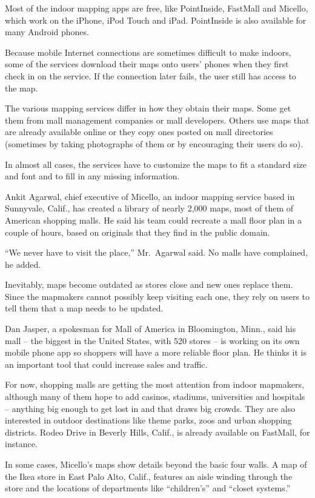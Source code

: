 ﻿\documentclass[12pt]{article}
\begin{document}
Most of the indoor mapping apps are free, like PointInside, FastMall and Micello, which work on the
iPhone, iPod Touch and iPad. PointInside is also available for many Android phones.

Because mobile Internet connections are sometimes difficult to make indoors, some of the services
download their maps onto users' phones when they first check in on the service. If the connection
later fails, the user still has access to the map.

The various mapping services differ in how they obtain their maps. Some get them from mall
management companies or mall developers. Others use maps that are already available online or they
copy ones posted on mall directories (sometimes by taking photographs of them or by encouraging
their users do so).

In almost all cases, the services have to customize the maps to fit a standard size and font and to
fill in any missing information.

Ankit Agarwal, chief executive of Micello, an indoor mapping service based in Sunnyvale, Calif., has
created a library of nearly 2,000 maps, most of them of American shopping malls. He said his team
could recreate a mall floor plan in a couple of hours, based on originals that they find in the
public domain.

``We never have to visit the place,'' Mr.~Agarwal said. No malls have complained, he added.

Inevitably, maps become outdated as stores close and new ones replace them. Since the mapmakers
cannot possibly keep visiting each one, they rely on users to tell them that a map needs to be
updated.

Dan Jasper, a spokesman for Mall of America in Bloomington, Minn., said his mall -- the biggest in
the United States, with 520 stores -- is working on its own mobile phone app so shoppers will have a
more reliable floor plan. He thinks it is an important tool that could increase sales and traffic.

For now, shopping malls are getting the most attention from indoor mapmakers, although many of them
hope to add casinos, stadiums, universities and hospitals -- anything big enough to get lost in and
that draws big crowds. They are also interested in outdoor destinations like theme parks, zoos and
urban shopping districts. Rodeo Drive in Beverly Hills, Calif., is already available on FastMall,
for instance.

In some cases, Micello's maps show details beyond the basic four walls. A map of the Ikea store in
East Palo Alto, Calif., features an aisle winding through the store and the locations of departments
like ``children's'' and ``closet systems.''
\end{document}
